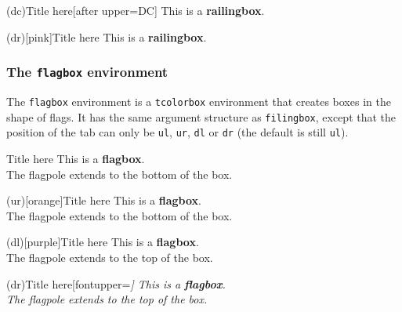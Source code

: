 \documentclass[10pt]{extarticle}
\newcommand{\<}{\langle}
\renewcommand{\>}{\rangle}
\theoremstyle{mystyle}{\newtheorem*{remark}{Remark}}
\theoremstyle{mystyle}{\newtheorem*{remarks}{Remarks}}
\theoremstyle{mystyle}{\newtheorem*{example}{Example}}
\theoremstyle{mystyle}{\newtheorem*{examples}{Examples}}
\theoremstyle{definition}{\newtheorem*{exercise}{Exercise}}
\theoremstyle{warn}
\begin{document}
\begin{verbbox}
\begin{railingbox}(dc){Title here}[after upper=DC]
This is a \textbf{railingbox}.
\end{railingbox}
\end{verbbox}

\begin{verbbox}
\begin{railingbox}(dr)[pink]{Title here}
This is a \textbf{railingbox}.
\end{railingbox}
\end{verbbox}

\subsubsection*{The \texttt{flagbox} environment}

The \texttt{flagbox} environment is a \texttt{tcolorbox} environment that creates boxes in the shape of flags. It has the same argument structure as \texttt{filingbox}, except that the position of the tab can only be \texttt{ul}, \texttt{ur}, \texttt{dl} or \texttt{dr} (the default is still \texttt{ul}).

\begin{verbbox}
\begin{flagbox}{Title here}
This is a \textbf{flagbox}.\\

The flagpole extends to the bottom of the box.
\end{flagbox}
\end{verbbox}
\begin{verbbox}
\begin{flagbox}(ur)[orange]{Title here}
This is a \textbf{flagbox}.\\

The flagpole extends to the bottom of the box.
\end{flagbox}
\end{verbbox}
\begin{verbbox}
\begin{flagbox}(dl)[purple]{Title here}
This is a \textbf{flagbox}.\\

The flagpole extends to the top of the box.
\end{flagbox}
\end{verbbox}
\begin{verbbox}
\begin{flagbox}(dr){Title here}[fontupper=\itshape]
This is a \textbf{flagbox}.\\

The flagpole extends to the top of the box.
\end{flagbox}
\end{verbbox}
\end{document}
